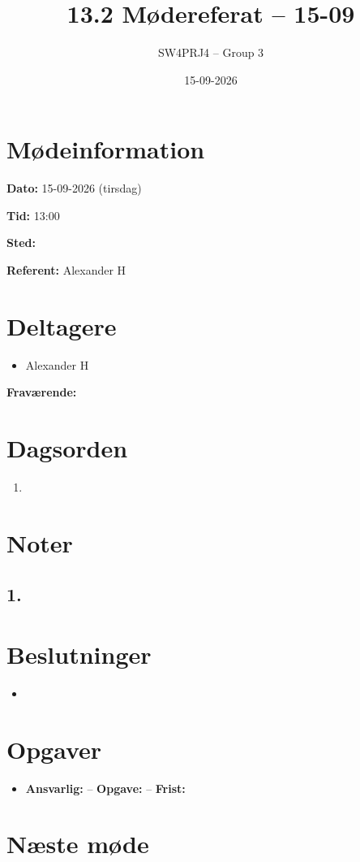 \documentclass[a4paper,11pt]{article}
\title{13.2 Mødereferat -- 15-09}
\author{SW4PRJ4 -- Group 3}
\date{15-09-2026}
\begin{document}
\maketitle

\section*{Mødeinformation}

\textbf{Dato:} 15-09-2026 (tirsdag)

\textbf{Tid:} 13:00

\textbf{Sted:}

\textbf{Referent:} Alexander H

\section*{Deltagere}

\begin{itemize}
    \item Alexander H
\end{itemize}

\textbf{Fraværende:}

\section*{Dagsorden}

\begin{enumerate}
    \item
\end{enumerate}

\section*{Noter}

\subsection*{1.}

\section*{Beslutninger}

\begin{itemize}
    \item
\end{itemize}

\section*{Opgaver}

\begin{itemize}
    \item \textbf{Ansvarlig:} -- \textbf{Opgave:} -- \textbf{Frist:}
\end{itemize}

\section*{Næste møde}
\end{document}
